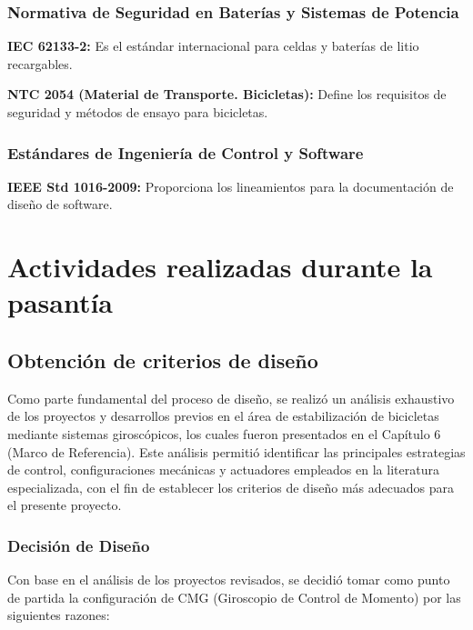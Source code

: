 \documentclass[12pt,letterpaper]{report}
\begin{document}
\subsection*{Normativa de Seguridad en Baterías y Sistemas de Potencia}

\textbf{IEC 62133-2:} Es el estándar internacional para celdas y baterías de litio recargables.

\textbf{NTC 2054 (Material de Transporte. Bicicletas):} Define los requisitos de seguridad y métodos de ensayo para bicicletas.

\subsection*{Estándares de Ingeniería de Control y Software}

\textbf{IEEE Std 1016-2009:} Proporciona los lineamientos para la documentación de diseño de software.

\chapter{Actividades realizadas durante la pasantía}

\section{Obtención de criterios de diseño}

Como parte fundamental del proceso de diseño, se realizó un análisis exhaustivo de los proyectos y desarrollos previos en el área de estabilización de bicicletas mediante sistemas giroscópicos, los cuales fueron presentados en el Capítulo 6 (Marco de Referencia). Este análisis permitió identificar las principales estrategias de control, configuraciones mecánicas y actuadores empleados en la literatura especializada, con el fin de establecer los criterios de diseño más adecuados para el presente proyecto.

\subsection*{Decisión de Diseño}

Con base en el análisis de los proyectos revisados, se decidió tomar como punto de partida la configuración de CMG (Giroscopio de Control de Momento) por las siguientes razones:
\end{document}
